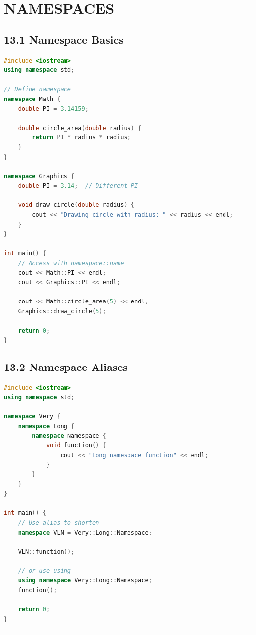 \hypertarget{namespaces}{%
\chapter{NAMESPACES}\label{namespaces}}

\hypertarget{namespace-basics}{%
\section{13.1 Namespace Basics}\label{namespace-basics}}

\begin{lstlisting}[language={C++}]
#include <iostream>
using namespace std;

// Define namespace
namespace Math {
    double PI = 3.14159;
    
    double circle_area(double radius) {
        return PI * radius * radius;
    }
}

namespace Graphics {
    double PI = 3.14;  // Different PI
    
    void draw_circle(double radius) {
        cout << "Drawing circle with radius: " << radius << endl;
    }
}

int main() {
    // Access with namespace::name
    cout << Math::PI << endl;
    cout << Graphics::PI << endl;
    
    cout << Math::circle_area(5) << endl;
    Graphics::draw_circle(5);
    
    return 0;
}
\end{lstlisting}

\hypertarget{namespace-aliases}{%
\section{13.2 Namespace Aliases}\label{namespace-aliases}}

\begin{lstlisting}[language={C++}]
#include <iostream>
using namespace std;

namespace Very {
    namespace Long {
        namespace Namespace {
            void function() {
                cout << "Long namespace function" << endl;
            }
        }
    }
}

int main() {
    // Use alias to shorten
    namespace VLN = Very::Long::Namespace;
    
    VLN::function();
    
    // or use using
    using namespace Very::Long::Namespace;
    function();
    
    return 0;
}
\end{lstlisting}

\begin{center}\rule{0.5\linewidth}{0.5pt}\end{center}
